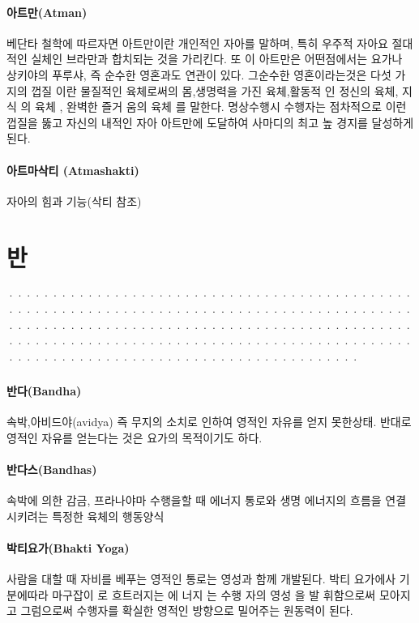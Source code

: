 \documentclass[12pt, a4paper, oneside]{book}
\let\stdsection\section
\renewcommand\section{\newpage\stdsection}
\begin{document}
\paragraph{아트만(Atman)}
베단타 철학에 따르자면 아트만이란 개인적인 자아를 말하며, 특히 우주적 자아요 절대적인 실체인 브라만과 합치되는 것을 가리킨다. 또 이 아트만은 어떤점에서는 요가나 상키야의 푸루샤, 즉 순수한 영혼과도 연관이 있다. 그순수한 영혼이라는것은 다섯 가지의 껍질 이란 물질적인 육체로써의 몸,생명력을 가진 육체,활동적 인 정신의 육체, 지식 의 육체 , 완벽한 즐거 움의 육체 를 말한다. 명상수행시 수행자는 점차적으로 이런 껍질을 뚫고 자신의 내적인 자아 아트만에 도달하여 사마디의 최고 높  경지를 달성하게 된다.

\paragraph{아트마삭티 (Atmashakti)}
자아의 힘과 기능(삭티 참조)


\newpage
\section{반}
································································································································································································································

\paragraph{반다(Bandha)}
속박,아비드야(avidya) 즉 무지의 소치로 인하여 영적인 자유를 얻지 못한상태. 반대로 영적인 자유를 얻는다는 것은 요가의 목적이기도 하다.

\paragraph{반다스(Bandhas)}
속박에 의한 감금, 프라나야마 수행을할 때 에너지 통로와 생명 에너지의 흐름을 연결시키려는 특정한 육체의 행동양식

\paragraph{박티요가(Bhakti Yoga)}
사람을 대할 때 자비를 베푸는 영적인 통로는 영성과 함께 개발된다. 박티 요가에사 기분에따라 마구잡이 로 흐트러지는 에 너지 는 수행 자의 영성 을 발   휘함으로써 모아지고 그럼으로써 수행자를 확실한 영적인 방향으로 밀어주는 원동력이 된다.
\end{document}
